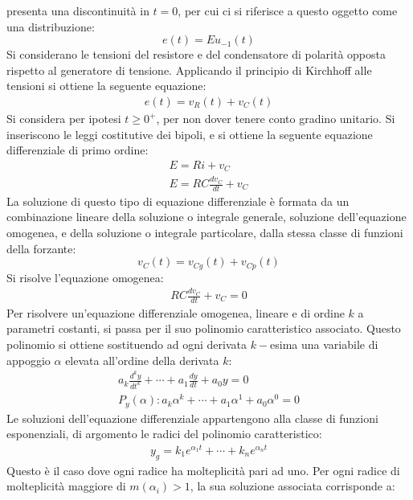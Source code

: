 \documentclass{article}
\numberwithin{equation}{subsection}
\begin{document}
presenta una discontinuità in $t=0$, per cui ci si riferisce a questo oggetto come una distribuzione:
\begin{equation*}
    e(t)=Eu_{-1}(t)
\end{equation*} Si considerano le tensioni del resistore e del condensatore di polarità 
opposta rispetto al generatore di tensione. Applicando il principio di Kirchhoff alle tensioni si ottiene la seguente equazione:
\begin{gather*}
    e(t)=v_R(t)+v_C(t)
\end{gather*}
Si considera per ipotesi $t\geq0^+$, per non dover tenere conto gradino unitario. Si inseriscono le leggi costitutive dei bipoli, e si ottiene la seguente equazione 
differenziale di primo ordine:
\begin{gather*}
    E=Ri+v_C\\
    E=RC\displaystyle\frac{dv_C}{dt}+v_C
\end{gather*}
La soluzione di questo tipo di equazione differenziale è formata da un combinazione lineare della soluzione o integrale generale, soluzione dell'equazione omogenea, e 
della soluzione o integrale particolare, dalla stessa classe di funzioni della forzante:
\begin{equation*}
    v_C(t)=v_{Cg}(t)+v_{Cp}(t)
\end{equation*}
Si risolve l'equazione omogenea:
\begin{gather*}
    RC\displaystyle\frac{dv_C}{dt}+v_C=0
\end{gather*}
Per risolvere un'equazione differenziale omogenea, lineare e di ordine $k$ a parametri costanti, si passa per il suo polinomio caratteristico associato. Questo polinomio 
si ottiene sostituendo ad ogni derivata $k-$esima una variabile di appoggio $\alpha$ elevata all'ordine della derivata $k$:
\begin{gather*}
    \displaystyle a_k\frac{d^ky}{dt^k}+\cdots+a_1\frac{dy}{dt}+a_0y=0\\
    P_y(\alpha):a_k\alpha^k+\cdots+a_1\alpha^1+a_0\alpha^0=0
\end{gather*}
Le soluzioni dell'equazione differenziale appartengono alla classe di funzioni esponenziali, di argomento le radici del polinomio caratteristico:
\begin{gather*}
    y_g=k_1e^{\alpha_1t}+\cdots+k_ne^{\alpha_nt}
\end{gather*}
Questo è il caso dove ogni radice ha molteplicità pari ad uno. Per ogni radice di molteplicità maggiore di $m(\alpha_i)>1$, la sua soluzione associata corrisponde a:
\end{document}
